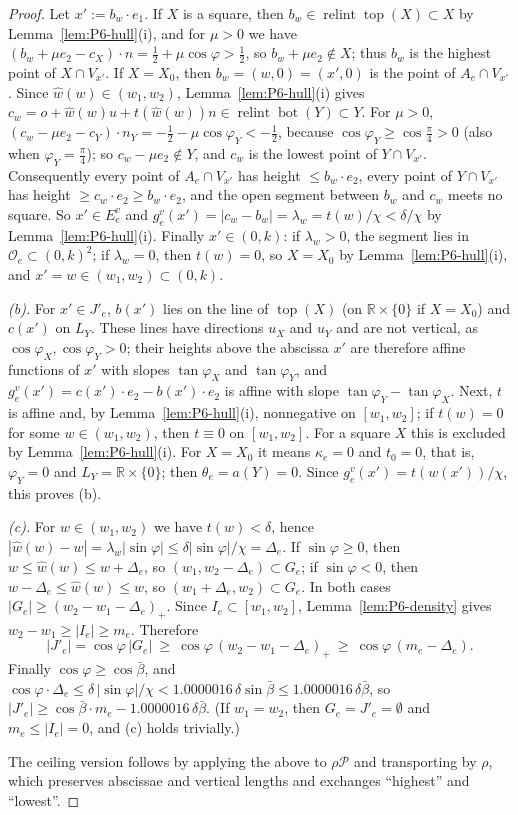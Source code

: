 \documentclass[11pt]{amsart}
\newcommand{\R}{\mathbb R}
\newcommand{\cP}{\mathcal P}
\newcommand{\relint}{\operatorname{relint}}
\newcommand{\Bot}{\operatorname{bot}}
\newcommand{\Top}{\operatorname{top}}
\newcommand{\bbar}{\bar\beta}
\theoremstyle{definition}
\theoremstyle{remark}
\numberwithin{equation}{section}
\begin{document}
\begin{proof}
Let $x':=b_w\cdot e_1$. If $X$ is a square, then $b_w\in\relint\Top(X)\subset X$ by Lemma~\ref{lem:P6-hull}(i), and
for $\mu>0$ we have $(b_w+\mu e_2-c_X)\cdot n=\frac12+\mu\cos\varphi>\frac12$, so $b_w+\mu e_2\notin X$; thus $b_w$ is
the highest point of $X\cap V_{x'}$. If $X=X_0$, then $b_w=(w,0)=(x',0)$ is the point of $A_e\cap V_{x'}$. Since
$\hat w(w)\in(w_1,w_2)$, Lemma~\ref{lem:P6-hull}(i) gives $c_w=o+\hat w(w)u+t(\hat w(w))n\in\relint\Bot(Y)\subset Y$.
For $\mu>0$, $(c_w-\mu e_2-c_Y)\cdot n_Y=-\frac12-\mu\cos\varphi_Y<-\frac12$, because
$\cos\varphi_Y\ge\cos\frac\pi4>0$ (also when $\varphi_Y=\frac\pi4$); so $c_w-\mu e_2\notin Y$, and $c_w$ is the lowest
point of $Y\cap V_{x'}$. Consequently every point of $A_e\cap V_{x'}$ has height $\le b_w\cdot e_2$, every point of
$Y\cap V_{x'}$ has height $\ge c_w\cdot e_2\ge b_w\cdot e_2$, and the open segment between $b_w$ and $c_w$ meets no
square. So $x'\in E^v_e$ and $g^v_e(x')=|c_w-b_w|=\lambda_w=t(w)/\chi<\delta/\chi$ by Lemma~\ref{lem:P6-hull}(i).
Finally $x'\in(0,k)$: if $\lambda_w>0$, the segment lies in $\mathcal O_e\subset(0,k)^2$; if $\lambda_w=0$, then
$t(w)=0$, so $X=X_0$ by Lemma~\ref{lem:P6-hull}(i), and $x'=w\in(w_1,w_2)\subset(0,k)$.

\emph{(b).} For $x'\in J'_e$, $b(x')$ lies on the line of $\Top(X)$ (on $\R\times\{0\}$ if $X=X_0$) and $c(x')$ on
$L_Y$. These lines have directions $u_X$ and $u_Y$ and are not vertical, as $\cos\varphi_X,\cos\varphi_Y>0$; their
heights above the abscissa $x'$ are therefore affine functions of $x'$ with slopes $\tan\varphi_X$ and
$\tan\varphi_Y$, and $g^v_e(x')=c(x')\cdot e_2-b(x')\cdot e_2$ is affine with slope $\tan\varphi_Y-\tan\varphi_X$. Next,
$t$ is affine and, by Lemma~\ref{lem:P6-hull}(i), nonnegative on $[w_1,w_2]$; if $t(w)=0$ for some $w\in(w_1,w_2)$,
then $t\equiv0$ on $[w_1,w_2]$. For a square $X$ this is excluded by Lemma~\ref{lem:P6-hull}(i). For $X=X_0$ it means
$\kappa_e=0$ and $t_0=0$, that is, $\varphi_Y=0$ and $L_Y=\R\times\{0\}$; then $\theta_e=a(Y)=0$. Since
$g^v_e(x')=t(w(x'))/\chi$, this proves (b).

\emph{(c).} For $w\in(w_1,w_2)$ we have $t(w)<\delta$, hence
$|\hat w(w)-w|=\lambda_w|\sin\varphi|\le\delta|\sin\varphi|/\chi=\Delta_e$. If $\sin\varphi\ge0$, then
$w\le\hat w(w)\le w+\Delta_e$, so $(w_1,w_2-\Delta_e)\subset G_e$; if $\sin\varphi<0$, then
$w-\Delta_e\le\hat w(w)\le w$, so $(w_1+\Delta_e,w_2)\subset G_e$. In both cases $|G_e|\ge(w_2-w_1-\Delta_e)_+$.
Since $I_e\subset[w_1,w_2]$, Lemma~\ref{lem:P6-density} gives $w_2-w_1\ge|I_e|\ge m_e$. Therefore
\[
|J'_e|=\cos\varphi\,|G_e|\ \ge\ \cos\varphi\,(w_2-w_1-\Delta_e)_+\ \ge\ \cos\varphi\,(m_e-\Delta_e).
\]
Finally $\cos\varphi\ge\cos\bbar$, and
$\cos\varphi\cdot\Delta_e\le\delta\,|\sin\varphi|/\chi<1.0000016\,\delta\sin\bbar\le1.0000016\,\delta\bbar$, so
$|J'_e|\ge\cos\bbar\cdot m_e-1.0000016\,\delta\bbar$. (If $w_1=w_2$, then $G_e=J'_e=\emptyset$ and
$m_e\le|I_e|=0$, and (c) holds trivially.)

The ceiling version follows by applying the above to $\rho\cP$ and transporting by $\rho$, which preserves abscissae
and vertical lengths and exchanges ``highest'' and ``lowest''.
\end{proof}
\end{document}
